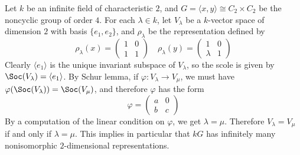 \begin{example}\label{representation of C_2 times C_2 char=2}
Let $k$ be an infinite field of characteristic $2$, and $G=\langle x,y\rangle\cong C_2\times C_2$ be the noncyclic group of order $4$. For each $\lambda\in k$, let $V_\lambda$ be a $k$-vector space of dimension $2$ with basis $\{e_1,e_2\}$, and $\rho_\lambda$ be the representation defined by
\[\rho_\lambda(x)=\begin{pmatrix}
1&0\\
1&1
\end{pmatrix}\quad\rho_\lambda(y)=\begin{pmatrix}
1&0\\
\lambda&1
\end{pmatrix}\]
Clearly $\langle e_1\rangle$ is the unique invariant subspace of $V_\lambda$, so the scole is given by $\Soc(V_\lambda)=\langle e_1\rangle$. By Schur lemma, if $\varphi:V_\lambda\to V_\mu$, we must have $\varphi(\Soc(V_\lambda))=\Soc(V_{\mu})$, and therefore $\varphi$ has the form
\[\varphi=\begin{pmatrix}
a&0\\
b&c
\end{pmatrix}\]
By a computation of the linear condition on $\varphi$, we get $\lambda=\mu$. Therefore $V_{\lambda}=V_{\mu}$ if and only if $\lambda=\mu$. This implies in particular that $kG$ has infinitely many nonisomorphic $2$-dimensional representations.
\end{example}
